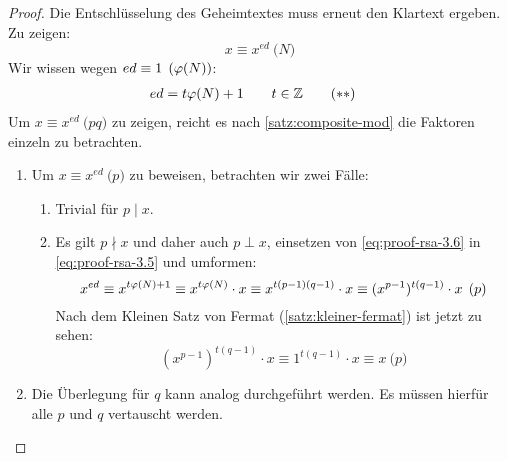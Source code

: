 \begin{proof}
  Die Entschlüsselung des Geheimtextes muss erneut den Klartext ergeben. Zu zeigen:
  \begin{equation}
    \label{eq:proof-rsa-3.5}
    x \equiv x^{ed} \pod{N} \tag{$*$}
  \end{equation}
  Wir wissen wegen $ed \equiv 1 \pod{\varphi(N)}$:
  \begin{align}
    \label{eq:proof-rsa-3.6}
    ed & = t\varphi(N) + 1 \qquad t \in \mathbb{Z} \tag{$**$}
  \end{align}
  Um $x \equiv x^{ed} \pod{pq}$ zu zeigen, reicht es nach \eqref{satz:composite-mod}
  die Faktoren einzeln zu betrachten.
  \begin{enumerate}
    \item Um $x \equiv x^{ed} \pod{p}$ zu beweisen, betrachten wir zwei Fälle:
          \begin{enumerate}[topsep=0pt]
            \item Trivial für $p \mid x$.
            \item Es gilt $p \nmid x$ und daher auch $p \perp x$, einsetzen von \eqref{eq:proof-rsa-3.6} in
                  \eqref{eq:proof-rsa-3.5}
                  und umformen:
                  \begin{equation*}
                    x^{ed} \equiv x^{t\varphi(N) + 1} \equiv
                    x^{t\varphi(N)} \cdot x \equiv
                    x^{t(p - 1)(q - 1)} \cdot x \equiv
                    (x^{p - 1})^{t(q - 1)} \cdot x \pod{p}
                  \end{equation*}
                  Nach dem Kleinen Satz von Fermat (\ref{satz:kleiner-fermat}) ist jetzt zu sehen:
                  \begin{equation*}
                    (x^{p - 1})^{t(q - 1)} \cdot x \equiv
                    1^{t(q - 1)} \cdot x \equiv x \pod{p}
                  \end{equation*}
          \end{enumerate}
    \item Die Überlegung für $q$ kann analog durchgeführt werden. Es müssen hierfür
          alle $p$ und $q$ vertauscht werden. \qedhere
  \end{enumerate}
\end{proof}


